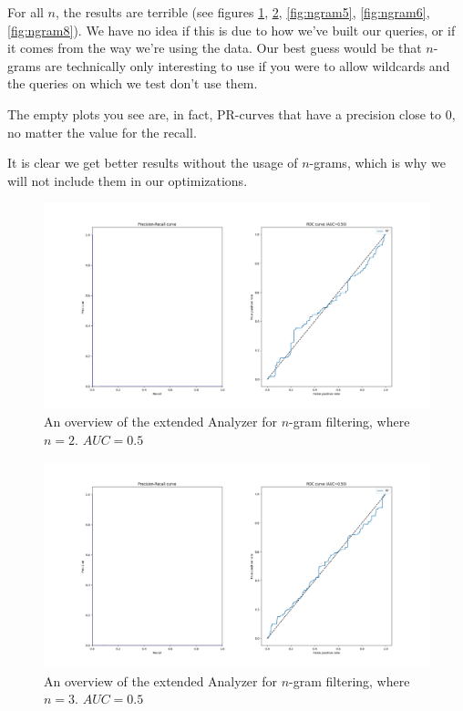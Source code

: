 \documentclass[11pt]{article}
\begin{document}
For all $n$, the results are terrible (see figures \ref{fig:ngram2}, \ref{fig:ngram3}, \ref{fig:ngram5}, \ref{fig:ngram6}, \ref{fig:ngram8}). We have no idea if this is due to how we've built our queries, or if it comes from the way we're using the data. Our best guess would be that $n$-grams are technically only interesting to use if you were to allow wildcards and the queries on which we test don't use them.

The empty plots you see are, in fact, PR-curves that have a precision close to 0, no matter the value for the recall.

It is clear we get better results without the usage of $n$-grams, which is why we will not include them in our optimizations.

\begin{figure}[htp]
    \centering
    \includegraphics[width=\textwidth]{images/customAna-n2}
    \caption{An overview of the extended Analyzer for $n$-gram filtering, where $n = 2$. $AUC = 0.5$}
    \label{fig:ngram2}
\end{figure}
\begin{figure}[htp]
	\centering
	\includegraphics[width=\textwidth]{images/customAna-n3}
	\caption{An overview of the extended Analyzer for $n$-gram filtering, where $n = 3$. $AUC = 0.5$}
	\label{fig:ngram3}
\end{figure}
\end{document}
